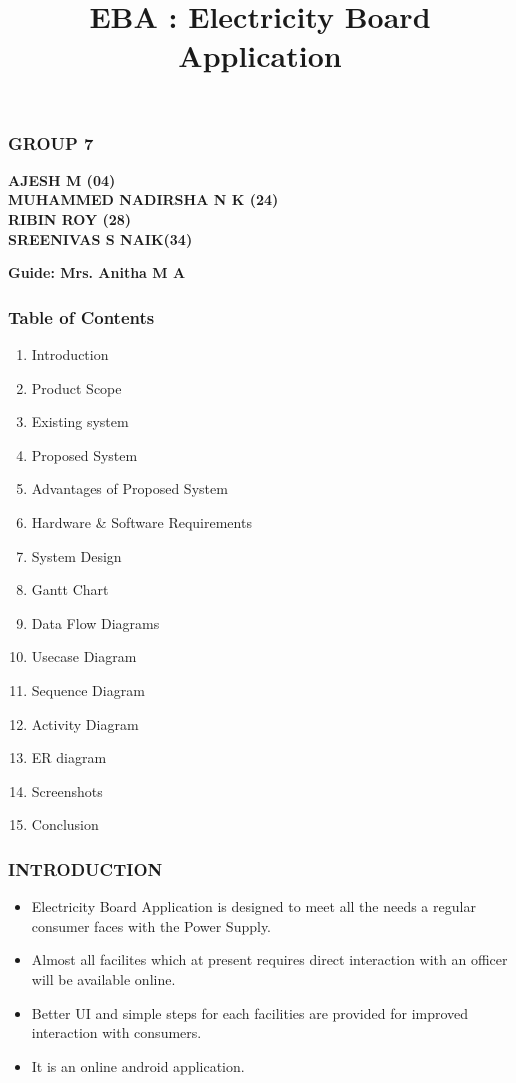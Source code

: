 \documentclass{beamer} %
\title{EBA : Electricity Board Application}
\institute{College of Engineering, Cherthala}
\theoremstyle{definition} %
\begin{document}
\titlepage





\begin{frame}
\frametitle{GROUP 7}
\textbf{AJESH M (04)\\ MUHAMMED NADIRSHA N K (24)\\ RIBIN ROY (28)\\ SREENIVAS S NAIK(34)}
\begin{flushright}
\textbf{Guide: Mrs. Anitha M A }
\end{flushright}
\end{frame}
\begin{frame} 
\frametitle{Table of Contents}
\begin{enumerate}
	\item Introduction
	\item Product Scope
	\item Existing system
	\item Proposed System
	\item Advantages of Proposed System
	\item Hardware \& Software Requirements
	\item System Design
	\item Gantt Chart
	\item Data Flow Diagrams
	\item Usecase Diagram
	\item Sequence Diagram
	\item Activity Diagram
	\item ER diagram
	\item Screenshots
	\item Conclusion
	

\end{enumerate}  
\end{frame}

\begin{frame} 
\frametitle{INTRODUCTION}
\begin{itemize}
	\item Electricity Board Application is designed to meet all the needs a regular consumer faces with the Power Supply.
	\item Almost all facilites which at present requires direct interaction with an officer will be available online.
	\item Better UI and simple steps for each facilities are provided for improved interaction with consumers.
	\item It is an online android application.
\end{itemize}
\end{frame}
\end{document}
